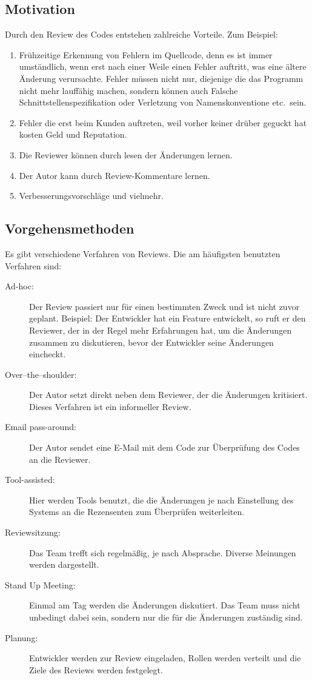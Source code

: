 \subsection{Motivation}
\label{subsec:Gründe}
Durch den Review des Codes entstehen zahlreiche Vorteile. Zum Beispiel:

\begin{enumerate}
	\item Frühzeitige Erkennung von Fehlern im Quellcode, denn es ist immer umständlich, wenn erst nach einer Weile einen Fehler auftritt, was eine ältere Änderung verursachte.
		Fehler müssen nicht nur, diejenige die das Programm nicht mehr lauffähig machen, sondern können auch Falsche Schnittstellenspezifikation oder Verletzung von Namenskonventione 
		etc.\ sein.
	\item Fehler die erst beim Kunden auftreten, weil vorher keiner drüber geguckt hat kosten Geld und Reputation.
	\item Die Reviewer können durch lesen der Änderungen lernen.
	\item Der Autor kann durch Review-Kommentare lernen.
	\item Verbesserungsvorschläge und vielmehr.
\end{enumerate}

\subsection{Vorgehensmethoden}
\label{subsec:Vorgehensmethoden}
Es gibt verschiedene Verfahren von Reviews. Die am häufigsten benutzten Verfahren sind:
\begin{description}
	\item [Ad-hoc:] Der Review passiert nur für einen bestimmten Zweck und ist nicht zuvor geplant. Beispiel: Der Entwickler hat ein Feature entwickelt, so ruft er den Reviewer, der in 				der Regel mehr Erfahrungen hat, um die Änderungen zusammen zu diskutieren, bevor der Entwickler seine Änderungen eincheckt.
	\item [Over–the–shoulder:] Der Autor setzt direkt neben dem Reviewer, der die Änderungen kritisiert. Dieses Verfahren ist ein informeller Review.
	\item [Email pass-around:] Der Autor sendet eine E-Mail mit dem Code zur Überprüfung des Codes an die Reviewer.
	\item [Tool-assisted:] Hier werden Tools benutzt, die die Änderungen je nach Einstellung des Systems an die Rezensenten zum Überprüfen weiterleiten.
	\item [Reviewsitzung:] Das Team trefft sich regelmäßig, je nach Absprache. Diverse Meinungen werden dargestellt.
	\item [Stand Up Meeting:] Einmal am Tag werden die Änderungen diskutiert. Das Team muss nicht unbedingt dabei sein, sondern nur die für die Änderungen zuständig sind.
	\item [Planung:] Entwickler werden zur Review eingeladen, Rollen werden verteilt und die Ziele des Reviews werden festgelegt.
\end{description}

